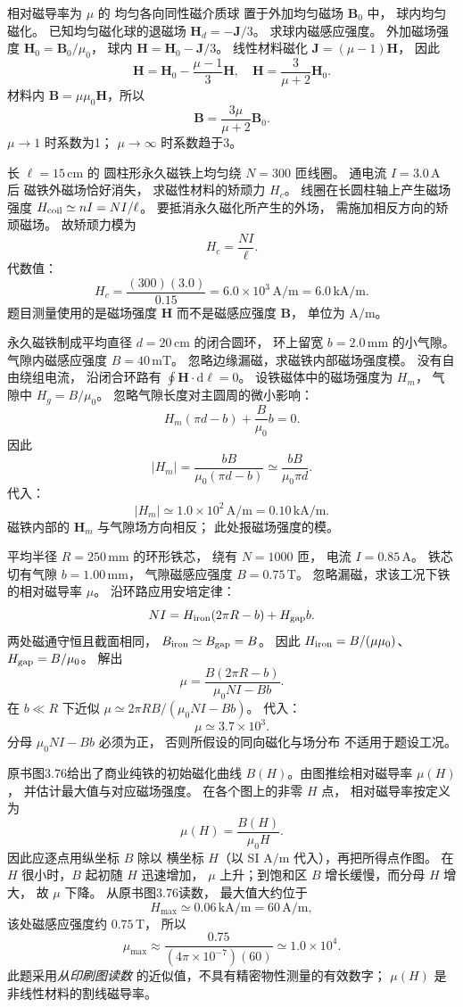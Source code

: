相对磁导率为 $\mu$ 的
均匀各向同性磁介质球
置于外加均匀磁场 $\bm B_0$ 中，
球内均匀磁化。
已知均匀磁化球的退磁场
$\bm H_d=-\bm J/3$。
求球内磁感应强度。
\exsolution
外加磁场强度
$\bm H_0=\bm B_0/\mu_0$，
球内
$\bm H=\bm H_0-\bm J/3$。
线性材料磁化
$\bm J=(\mu-1)\bm H$，
因此
\[
\bm H=\bm H_0-\frac{\mu-1}{3}\bm H,
\quad
\bm H=\frac3{\mu+2}\bm H_0.
\]
材料内
$\bm B=\mu\mu_0\bm H$，所以
\[
\boxed{\bm B=
\frac{3\mu}{\mu+2}\bm B_0}.
\]
\excheck $\mu\to1$ 时系数为1；
$\mu\to\infty$ 时系数趋于3。

长 $\ell=15\,\mathrm{cm}$ 的
圆柱形永久磁铁上均匀绕
$N=300$ 匝线圈。
通电流 $I=3.0\,\mathrm A$ 后
磁铁外磁场恰好消失，
求磁性材料的矫顽力 $H_c$。
\exsolution
线圈在长圆柱轴上产生磁场强度
$H_{\rm coil}\simeq nI=NI/\ell$。
要抵消永久磁化所产生的外场，
需施加相反方向的矫顽磁场。
故矫顽力模为
\[
\boxed{H_c=\frac{NI}{\ell}}.
\]
代数值：
\[
\boxed{H_c=\frac{(300)(3.0)}{0.15}
=6.0\times10^3\,\mathrm{A/m}
=6.0\,\mathrm{kA/m}}.
\]
\excheck 题目测量使用的是磁场强度
$\bm H$ 而不是磁感应强度 $\bm B$，
单位为 $\mathrm{A/m}$。

永久磁铁制成平均直径
$d=20\,\mathrm{cm}$ 的闭合圆环，
环上留宽
$b=2.0\,\mathrm{mm}$ 的小气隙。
气隙内磁感应强度
$B=40\,\mathrm{mT}$。
忽略边缘漏磁，求磁铁内部磁场强度模。
\exsolution
没有自由绕组电流，
沿闭合环路有
$\oint\bm H\cdot\mathrm d\bm\ell=0$。
设铁磁体中的磁场强度为 $H_m$，
气隙中
$H_g=B/\mu_0$。
忽略气隙长度对主圆周的微小影响：
\[
H_m(\pi d-b)+\frac B{\mu_0}b=0.
\]
因此
\[
\boxed{|H_m|=
\frac{bB}{\mu_0(\pi d-b)}
\simeq\frac{bB}{\mu_0\pi d}}.
\]
代入：
\[
\boxed{|H_m|\simeq1.0\times10^2\,
\mathrm{A/m}=0.10\,\mathrm{kA/m}}.
\]
\excheck 磁铁内部的 $\bm H_m$
与气隙场方向相反；
此处报磁场强度的模。

平均半径
$R=250\,\mathrm{mm}$ 的环形铁芯，
绕有 $N=1000$ 匝，
电流 $I=0.85\,\mathrm A$。
铁芯切有气隙
$b=1.00\,\mathrm{mm}$，
气隙磁感应强度
$B=0.75\,\mathrm T$。
忽略漏磁，求该工况下铁的相对磁导率 $\mu$。
\exsolution
沿环路应用安培定律：
\[
NI=H_{\rm iron}(2\pi R-b)+H_{\rm gap}b.
\]
两处磁通守恒且截面相同，
$B_{\rm iron}\simeq B_{\rm gap}=B$。
因此
$H_{\rm iron}=B/(\mu\mu_0)$、
$H_{\rm gap}=B/\mu_0$。
解出
\[
\boxed{\mu=
\frac{B(2\pi R-b)}
{\mu_0NI-Bb}}.
\]
在 $b\ll R$ 下近似
$\mu\simeq2\pi RB/(\mu_0NI-Bb)$。
代入：
\[
\boxed{\mu\simeq3.7\times10^3}.
\]
\excheck 分母 $\mu_0NI-Bb$ 必须为正，
否则所假设的同向磁化与场分布
不适用于题设工况。

原书图3.76给出了商业纯铁的初始磁化曲线
$B(H)$。由图推绘相对磁导率 $\mu(H)$，
并估计最大值与对应磁场强度。
\exsolution
在各个图上的非零 $H$ 点，
相对磁导率按定义为
\[
\boxed{\mu(H)=\frac{B(H)}{\mu_0H}}.
\]
因此应逐点用纵坐标 $B$ 除以
横坐标 $H$（以 SI
$\mathrm{A/m}$ 代入），再把所得点作图。
在 $H$ 很小时，$B$ 起初随 $H$ 迅速增加，
$\mu$ 上升；到饱和区
$B$ 增长缓慢，而分母 $H$ 增大，
故 $\mu$ 下降。
从原书图3.76读数，
最大值大约位于
\[
\boxed{H_{\max}\simeq0.06\,\mathrm{kA/m}
=60\,\mathrm{A/m}},
\]
该处磁感应强度约 $0.75\,\mathrm T$，
所以
\[
\boxed{\mu_{\max}\approx
\frac{0.75}{(4\pi\times10^{-7})(60)}
\simeq1.0\times10^4}.
\]
\excheck 此题采用\emph{从印刷图读数}
的近似值，不具有精密物性测量的有效数字；
$\mu(H)$ 是非线性材料的割线磁导率。

